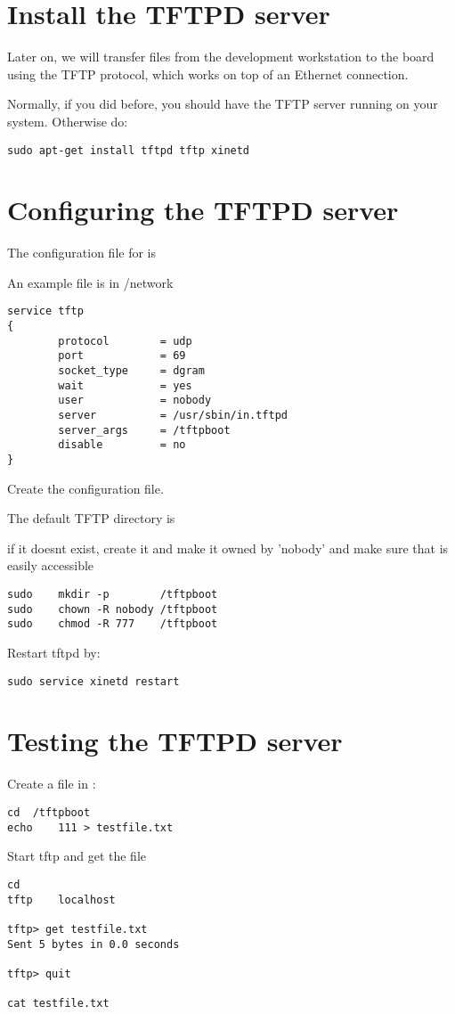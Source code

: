 
\section{Install the TFTPD server}

Later on, we will transfer files from the development workstation to
the board using the TFTP protocol, which works on top of an Ethernet
connection.

Normally, if you did  before, you should have
the TFTP server running on your system. Otherwise do:

\begin{verbatim}
sudo apt-get install tftpd tftp xinetd
\end{verbatim}

\section{Configuring the TFTPD server}

The configuration file for  is 

An example  file is in \labdir /network
\begin{verbatim}
service tftp
{
        protocol        = udp
        port            = 69
        socket_type     = dgram
        wait            = yes
        user            = nobody
        server          = /usr/sbin/in.tftpd
        server_args     = /tftpboot
        disable         = no
}
\end{verbatim}

Create the configuration file.

The default TFTP directory is 

if it doesnt exist, create it and make it owned by 'nobody'
and make sure that   is easily accessible


\begin{verbatim}
sudo    mkdir -p        /tftpboot
sudo    chown -R nobody /tftpboot
sudo    chmod -R 777    /tftpboot
\end{verbatim}

Restart tftpd by:

\begin{verbatim}
sudo service xinetd restart
\end{verbatim}

\clearpage
\section{Testing the TFTPD server}

Create a file in :

\begin{verbatim}
cd	/tftpboot
echo	111	> testfile.txt
\end{verbatim}

Start tftp and get the file

\begin{verbatim}
cd
tftp	localhost

tftp> get testfile.txt
Sent 5 bytes in 0.0 seconds

tftp> quit

cat testfile.txt

\end{verbatim}


